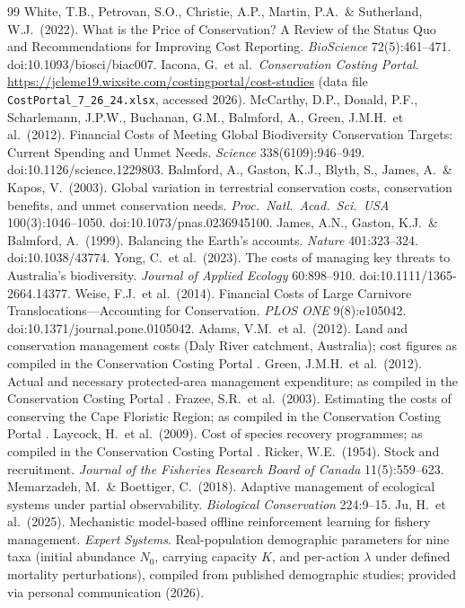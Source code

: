 \documentclass[11pt]{article}
\begin{document}
\begin{thebibliography}{99}
 White, T.B., Petrovan, S.O., Christie, A.P., Martin, P.A.\ \& Sutherland, W.J.\ (2022).
What is the Price of Conservation? A Review of the Status Quo and Recommendations for Improving Cost Reporting.
\emph{BioScience} 72(5):461--471. doi:10.1093/biosci/biac007.
 Iacona, G.\ et al.\ \emph{Conservation Costing Portal}.
\url{https://jcleme19.wixsite.com/costingportal/cost-studies} (data file \texttt{CostPortal\_7\_26\_24.xlsx}, accessed 2026).
 McCarthy, D.P., Donald, P.F., Scharlemann, J.P.W., Buchanan, G.M., Balmford, A., Green, J.M.H.\ et al.\ (2012).
Financial Costs of Meeting Global Biodiversity Conservation Targets: Current Spending and Unmet Needs.
\emph{Science} 338(6109):946--949. doi:10.1126/science.1229803.
 Balmford, A., Gaston, K.J., Blyth, S., James, A.\ \& Kapos, V.\ (2003).
Global variation in terrestrial conservation costs, conservation benefits, and unmet conservation needs.
\emph{Proc.\ Natl.\ Acad.\ Sci.\ USA} 100(3):1046--1050. doi:10.1073/pnas.0236945100.
 James, A.N., Gaston, K.J.\ \& Balmford, A.\ (1999). Balancing the Earth's accounts.
\emph{Nature} 401:323--324. doi:10.1038/43774.
 Yong, C.\ et al.\ (2023). The costs of managing key threats to Australia's biodiversity.
\emph{Journal of Applied Ecology} 60:898--910. doi:10.1111/1365-2664.14377.
 Weise, F.J.\ et al.\ (2014). Financial Costs of Large Carnivore Translocations---Accounting for Conservation.
\emph{PLOS ONE} 9(8):e105042. doi:10.1371/journal.pone.0105042.
 Adams, V.M.\ et al.\ (2012). Land and conservation management costs (Daly River catchment, Australia);
cost figures as compiled in the Conservation Costing Portal \cite{iaconaportal}.
 Green, J.M.H.\ et al.\ (2012). Actual and necessary protected-area management expenditure;
as compiled in the Conservation Costing Portal \cite{iaconaportal}.
 Frazee, S.R.\ et al.\ (2003). Estimating the costs of conserving the Cape Floristic Region;
as compiled in the Conservation Costing Portal \cite{iaconaportal}.
 Laycock, H.\ et al.\ (2009). Cost of species recovery programmes;
as compiled in the Conservation Costing Portal \cite{iaconaportal}.
 Ricker, W.E.\ (1954). Stock and recruitment.
\emph{Journal of the Fisheries Research Board of Canada} 11(5):559--623.
 Memarzadeh, M.\ \& Boettiger, C.\ (2018). Adaptive management of ecological systems under partial observability.
\emph{Biological Conservation} 224:9--15.
 Ju, H.\ et al.\ (2025). Mechanistic model-based offline reinforcement learning for fishery management.
\emph{Expert Systems}.
 Real-population demographic parameters for nine taxa (initial abundance $N_0$, carrying capacity $K$,
and per-action $\lambda$ under defined mortality perturbations), compiled from published demographic studies;
provided via personal communication (2026).
\end{thebibliography}
\end{document}
